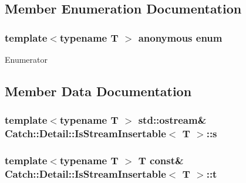 \subsection{Member Enumeration Documentation}
\hypertarget{struct_catch_1_1_detail_1_1_is_stream_insertable_a2e4508694da3bf368ff67733a7970edd}{\subsubsection[{anonymous enum}]{\setlength{\rightskip}{0pt plus 5cm}template$<$typename T $>$ anonymous enum}}\label{struct_catch_1_1_detail_1_1_is_stream_insertable_a2e4508694da3bf368ff67733a7970edd}
\begin{Desc}
\item[Enumerator]\par
\begin{description}
\item[{\em 
\hypertarget{struct_catch_1_1_detail_1_1_is_stream_insertable_a2e4508694da3bf368ff67733a7970edda765a324929702bfce2969fc19fc4f926}{value}\label{struct_catch_1_1_detail_1_1_is_stream_insertable_a2e4508694da3bf368ff67733a7970edda765a324929702bfce2969fc19fc4f926}
}]\end{description}
\end{Desc}


\subsection{Member Data Documentation}
\hypertarget{struct_catch_1_1_detail_1_1_is_stream_insertable_abe3d3c8e5d85665747faafffc9a96b00}{
\subsubsection[{s}]{\setlength{\rightskip}{0pt plus 5cm}template$<$typename T $>$ std\-::ostream\& {\bf Catch\-::\-Detail\-::\-Is\-Stream\-Insertable}$<$ T $>$\-::s\hspace{0.3cm}{\ttfamily [static]}}}\label{struct_catch_1_1_detail_1_1_is_stream_insertable_abe3d3c8e5d85665747faafffc9a96b00}
\hypertarget{struct_catch_1_1_detail_1_1_is_stream_insertable_a7d2a3da978b6736667a7b2f6d51f507f}{
\subsubsection[{t}]{\setlength{\rightskip}{0pt plus 5cm}template$<$typename T $>$ T const\& {\bf Catch\-::\-Detail\-::\-Is\-Stream\-Insertable}$<$ T $>$\-::t\hspace{0.3cm}{\ttfamily [static]}}}\label{struct_catch_1_1_detail_1_1_is_stream_insertable_a7d2a3da978b6736667a7b2f6d51f507f}


